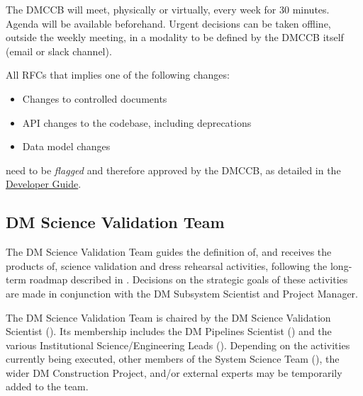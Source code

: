 The DMCCB will meet, physically or virtually, every week for 30 minutes. Agenda will be available beforehand.
Urgent decisions can be taken offline, outside the weekly meeting, in a modality to be defined by the DMCCB itself (email or slack channel).

All RFCs that implies one of the following changes:

\begin{itemize}
\item Changes to controlled documents
\item API changes to the codebase, including deprecations
\item Data model changes
\end{itemize}
 
need to be \textit{flagged} and therefore approved by the DMCCB, as detailed in the \href{https://developer.lsst.io/communications/rfc.html#rfc-exceptions}{Developer Guide}.


\subsection{DM Science Validation Team}
\label{sect:dmsvt}

The DM Science Validation Team guides the definition of, and receives the products of, science validation and dress rehearsal activities, following the long-term roadmap described in .
Decisions on the strategic goals of these activities are made in conjunction with the DM Subsystem Scientist and Project Manager.

The DM Science Validation Team is chaired by the DM Science Validation Scientist ().
Its membership includes the DM Pipelines Scientist () and the various Institutional Science/Engineering Leads ().
Depending on the activities currently being executed, other members of the System Science Team (), the wider DM Construction Project, and/or external experts may be temporarily added to the team.
